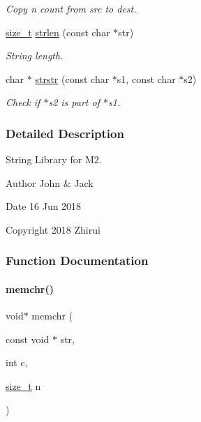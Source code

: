 \begin{DoxyCompactItemize}
\begin{DoxyCompactList}\small\item\em Copy n count from src to dest. \end{DoxyCompactList}\item 
\mbox{\hyperlink{a00074_a43b4547e12226fef871eed8afe191ad7}{size\+\_\+t}} \mbox{\hyperlink{a00074_a008e171a518fe0e0352f31b245e03875}{strlen}} (const char $\ast$str)
\begin{DoxyCompactList}\small\item\em String length. \end{DoxyCompactList}\item 
char $\ast$ \mbox{\hyperlink{a00074_aeb923ee2a7a01f82eb1e2f8ae188c6d4}{strstr}} (const char $\ast$s1, const char $\ast$s2)
\begin{DoxyCompactList}\small\item\em Check if $\ast$s2 is part of $\ast$s1. \end{DoxyCompactList}\end{DoxyCompactItemize}


\subsubsection{Detailed Description}
String Library for M2. 

\begin{DoxyAuthor}{Author}
John \& Jack 
\end{DoxyAuthor}
\begin{DoxyDate}{Date}
16 Jun 2018 
\end{DoxyDate}
\begin{DoxyCopyright}{Copyright}
2018 Zhirui 
\end{DoxyCopyright}


\subsubsection{Function Documentation}
\mbox{\label{a00074_af2c756015b1cb92274fc019a175ae8bb}} 
\paragraph{\texorpdfstring{memchr()}{memchr()}}
{\footnotesize\ttfamily void$\ast$ memchr (\begin{DoxyParamCaption}\item[{const void $\ast$}]{str,  }\item[{int}]{c,  }\item[{\mbox{\hyperlink{a00074_a43b4547e12226fef871eed8afe191ad7}{size\+\_\+t}}}]{n }\end{DoxyParamCaption})}



